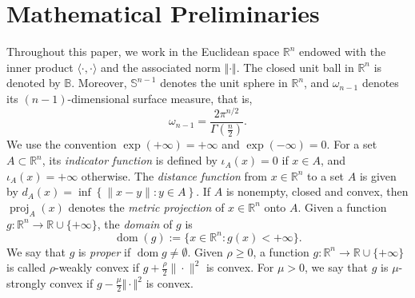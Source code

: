 \documentclass[11pt]{article}
\newcommand{\1}{\mathds{1}}
\theoremstyle{definition}
\theoremstyle{remark}
\theoremstyle{definition}
\newcommand{\R}{\mathbb{R}}
\begin{document}
\section{Mathematical Preliminaries}\label{preliminaries}
Throughout this paper, we work in the  Euclidean space $\mathbb{R}^n$ endowed with the inner product $\langle \cdot, \cdot\rangle$ and the associated norm $\Vert \cdot\Vert$. The closed unit ball in $\mathbb{R}^n$ is denoted by $\mathbb{B}$. Moreover, \(\mathbb S^{n-1}\) denotes the unit
sphere in \(\R^n\), and $\omega_{n-1}$ denotes its \((n-1)\)-dimensional surface measure, that is, $$\omega_{n-1}= \frac{2 \pi^{n/2}}{\Gamma\left(\frac{n}{2}\right)}.$$ We use the convention $\exp(+\infty) =+\infty $ and $\exp( -\infty ) = 0$.  For a set $A\subset\mathbb{R}^n$, its \emph{indicator function} is defined by $\iota_A(x)=0$ if $x\in A$, and $\iota_A(x)=+\infty$ otherwise. The \emph{distance function} from $x\in \mathbb{R}^n$  to a set $A$ is given by $d_{A}(x)=\inf\left\{  \|  x - y\| : y\in A\right\}$. If $A$ is nonempty, closed and convex, then $\operatorname{proj}_{A} (x)$ denotes the  \emph{metric projection} of $x\in \mathbb{R}^n$ onto $A$.  Given a function $g\colon \mathbb{R}^n \rightarrow \mathbb{R}\cup \{+\infty \}$, the \emph{domain} of $g$ is
\begin{equation*}
\operatorname{dom}(g):=\{x\in \mathbb{R}^n: g(x)<+\infty \}.
\end{equation*}
We say that $g$ is \emph{proper} if $\operatorname{dom}g\neq
\emptyset$. Given $\rho\geq 0$, a function $g\colon \R^n\to \mathbb{\R}\cup \{+\infty \}$ is called $\rho$-weakly convex if $g+\frac{\rho}{2}\|\cdot\|^2$ is convex. For $\mu>0$, we say that $g$ is $\mu$-strongly convex if $g-\frac{\mu}{2}\Vert \cdot\Vert^2$ is convex.
\end{document}
